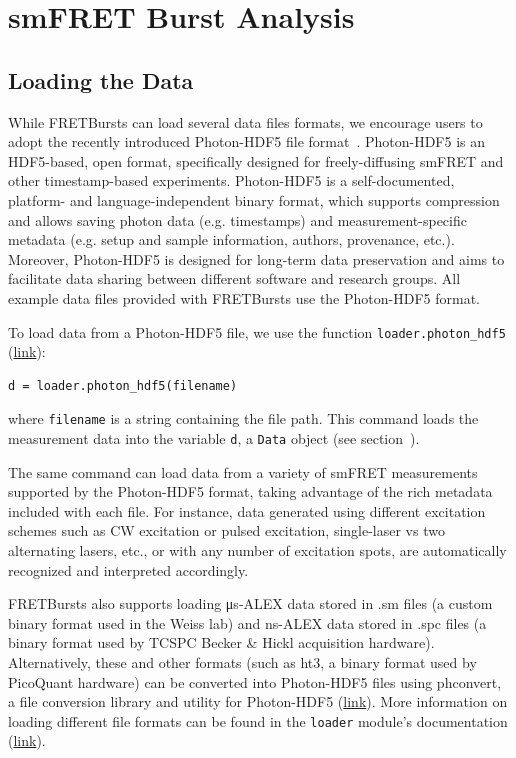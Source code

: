 \documentclass[10pt,letterpaper]{article}
\begin{document}
\section*{smFRET Burst Analysis}
\label{sec:analysis}

\subsection*{Loading the Data}
\label{sec:dataload}
While FRETBursts can load several data files formats,
we encourage users to adopt the recently introduced Photon-HDF5
file format~\cite{Ingargiola2016}.
Photon-HDF5 is an HDF5-based, open format, specifically designed
for freely-diffusing smFRET and
other timestamp-based experiments.
Photon-HDF5 is a self-documented, platform- and language-independent binary format,
which supports compression and allows saving photon data (e.g. timestamps)
and measurement-specific metadata
(e.g. setup and sample information, authors, provenance, etc.).
Moreover, Photon-HDF5 is designed for long-term data preservation and aims
to facilitate data sharing
between different software and research groups.
All example data files provided with FRETBursts use the Photon-HDF5 format.

To load data from a Photon-HDF5 file, we use the function \verb|loader.photon_hdf5|
(\href{http://fretbursts.readthedocs.org/en/latest/loader.html#fretbursts.loader.photon_hdf5}{link}):

\begin{lstlisting}
d = loader.photon_hdf5(filename)
\end{lstlisting}

\noindent
where \verb|filename| is a string containing the file path.
This command loads the measurement data into the variable \verb|d|,
a \verb|Data| object (see section~).

The same command can load data from a variety of smFRET measurements supported
by the Photon-HDF5 format, taking advantage of the rich metadata included with each file.
For instance, data generated using different excitation schemes such as CW excitation
or pulsed excitation, single-laser vs two alternating lasers, etc.,
or with any number of excitation spots, are automatically recognized and interpreted accordingly.

FRETBursts also supports loading μs-ALEX data stored in .sm files
(a custom binary format used in the Weiss lab) and
ns-ALEX data stored in .spc files (a binary format used by TCSPC Becker \& Hickl acquisition hardware).
Alternatively, these and other formats (such as ht3, a binary format used by PicoQuant hardware)
can be converted into Photon-HDF5 files using phconvert,
a file conversion library and utility for Photon-HDF5
(\href{http://photon-hdf5.github.io/phconvert/}{link}).
More information on loading different file formats
can be found in the \verb|loader| module's documentation
(\href{http://fretbursts.readthedocs.org/en/latest/loader.html}{link}).
\end{document}
